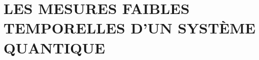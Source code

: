 \documentclass[superscriptaddress,12pt]{article}
\begin{document}


    \pagebreak
    
    \thispagestyle{empty}
    \section{LES MESURES FAIBLES TEMPORELLES D'UN SYSTÈME QUANTIQUE}
    
    \pagebreak
\end{document}
